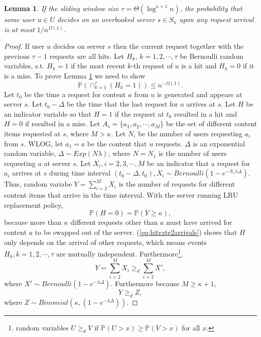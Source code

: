 \documentclass[conference]{IEEEtran}
\newtheorem{lemma}[theorem]{Lemma}
\newcommand{\prob}[1]{\mathbb{P}\left( #1 \right)}
\begin{document}
\begin{lemma}\label{lem:overbookhit}
If the sliding window size $\tau = \Theta(\log^{\kappa+1}n)$, the probability that some user $u \in U$ decides on an overbooked server $s \in S_u$ upon any request arrival is at most  $1/n^{\Omega(1)}$. 
\end{lemma}
\begin{proof}
If user $u$ decides on server $s$  then the current request together with the previous $\tau-1$ requests are all hits. Let $H_k$, $k=1,2,\cdots,\tau$ be Bernoulli random variables, s.t. $H_k = 1$ if the most recent $k$-th request of $u$ is a hit and $H_k=0$ if it is a miss. To prove Lemma \ref{lem:overbookhit} we need to show 
\begin{equation}\label{eq:hittau}
\prob{\cap_{k=1}^{\tau}(H_k=1)} \leq n^{-\Omega(1)}.
\end{equation}
Let $t_0$ be the time a request for content $a$ from $u$ is generated and appears at server $s$. Let $t_0-\Delta$ be the time that the last request for $a$ arrives at $s$. Let $H$ be an indicator variable so that $H=1$ if the request at $t_0$ resulted in a hit and $H=0$ if resulted in a miss. Let $A_s=\{a_1,a_2,\cdots,a_M\}$ be the set of different content items requested at $s$, where $M>\kappa$. Let $N_i$ be the number of users requesting $a_i$ from $s$. WLOG, let $a_1=a$ be the content that $u$ requests. $\Delta$ is an exponential random variable, $\Delta\sim Exp(N\lambda)$, where $N=N_1$ is the number of users requesting $a$ at server $s$. Let $X_i, i=2,3,\cdots,M$ be an indicator that a request for $a_i$ arrives at $s$ during time interval $(t_0-\Delta,t_0), X_i\sim Bernoulli(1-e^{-N_i\lambda\Delta})$.
Thus, random variabe $Y=\sum_{i=2}^M X_i$ is the number of requests for different content items that arrive in the time interval. With the server running LRU replacement policy, 
\begin{equation}\label{eq:hitrate2arrivals}
\prob{H=0} = \prob{Y\geq \kappa},
\end{equation}
because more than $\kappa$ different requests other than $a$ must have arrived for content $a$ to be swapped out of the server. (\ref{eq:hitrate2arrivals}) shows that $H$ only depends on the arrival of other requests, which means events $H_k, k=1,2,\cdots,\tau$ are mutually independent. Furthermore\footnote{random variables $U\geq_dV$ if $\prob{U>x}\geq\prob{V>x}$ for all $x$.},
$$
Y = \sum_{i=2}^M X_i \geq_{d} \sum_{i=2}^M X',
$$
where $X'\sim Bernoulli(1-e^{-\lambda\Delta})$. Furthermore because $M\geq\kappa+1$, 
$$
Y \geq_{d} Z,
$$
where $Z\sim Binomial(\kappa, (1-e^{-\lambda\Delta}))$.


\end{proof}
\end{document}
